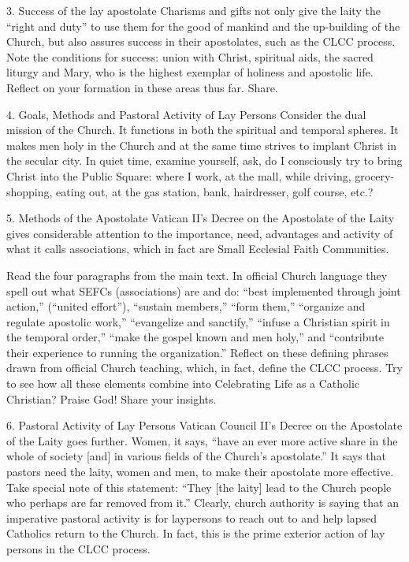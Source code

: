 \documentclass[oneside]{book}
\begin{document}
3. Success of the lay apostolate
Charisms and gifts not only give the laity the ``right and duty'' to use them
for the good of mankind and the up-building of the Church, but also assures
success in their apostolates, such as the CLCC process. Note the conditions for
success: union with Christ, spiritual aids, the sacred liturgy and Mary, who is
the highest exemplar of holiness and apostolic life. Reflect on your formation
in these areas thus far. Share.


4. Goals, Methods and Pastoral Activity of Lay Persons
Consider the dual mission of the Church. It functions in both the spiritual and
temporal spheres. It makes men holy in the Church and at the same time strives
to implant Christ in the secular city. In quiet time, examine yourself, ask, do
I consciously try to bring Christ into the Public Square: where I work, at the
mall, while driving, grocery-shopping, eating out, at the gas station, bank,
hairdresser, golf course, etc.?

5. Methods of the Apostolate
Vatican II's Decree on the Apostolate of the Laity gives considerable attention
to the importance, need, advantages and activity of what it calls associations,
which in fact are Small Ecclesial Faith Communities.

Read the four paragraphs from the main text. In official Church language they
spell out what SEFCs (associations) are and do: ``best implemented through joint
action,'' (``united effort''), ``sustain members,'' ``form them,'' ``organize
and regulate apostolic work,'' ``evangelize and sanctify,'' ``infuse a Christian
spirit in the temporal order,'' ``make the gospel known and men holy,'' and
``contribute their experience to running the organization.'' Reflect on these
defining phrases drawn from official Church teaching, which, in fact, define the
CLCC process. Try to see how all these elements combine into Celebrating Life as
a Catholic Christian? Praise God! Share your insights.

6. Pastoral Activity of Lay Persons
Vatican Council II's Decree on the Apostolate of the Laity goes further. Women,
it says, ``have an ever more active share in the whole of society [and] in
various fields of the Church's apostolate.'' It says that pastors need the
laity, women and men, to make their apostolate more effective. Take special note
of this statement: ``They [the laity] lead to the Church people who perhaps are
far removed from it.'' Clearly, church authority is saying that an imperative
pastoral activity is for laypersons to reach out to and help lapsed Catholics
return to the Church. In fact, this is the prime exterior action of lay persons
in the CLCC process.
\end{document}
